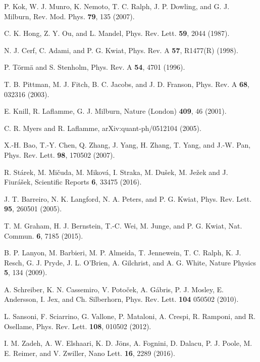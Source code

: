 \documentclass[aps,pra,twocolumn,superscriptaddress,floatfix,10pt]{revtex4}
\begin{document}
\begin{thebibliography}{99}
	
  P. Kok, W. J. Munro,   K.   Nemoto,   T. C.   Ralph,   J. P.
Dowling, and G. J. Milburn, Rev. Mod. Phys. {\bf 79}, 135 (2007).

 C. K. Hong, Z. Y. Ou, and L. Mandel, Phys. Rev. Lett. {\bf 59}, 2044 (1987).

 N. J. Cerf, C. Adami, and P. G. Kwiat, Phys. Rev. A {\bf 57}, R1477(R) (1998).

 P. T\"orm\"a and S. Stenholm, Phys. Rev. A {\bf 54}, 4701 (1996).

 T. B. Pittman, M. J. Fitch, B. C. Jacobs, and J. D. Franson,
Phys. Rev. A {\bf 68}, 032316 (2003).

  E. Knill, R. Laflamme, G. J. Milburn, Nature (London) {\bf 409}, 46 (2001).

 C. R. Myers and R. Laflamme, arXiv:quant-ph/0512104 (2005).

 X.-H. Bao, T.-Y. Chen, Q. Zhang, J. Yang, H. Zhang, T. Yang, and J.-W. Pan,
Phys. Rev. Lett. {\bf 98}, 170502 (2007).

 R. St\'{a}rek, M. Mi\v{c}uda, M. Mikov\'{a}, I. Straka, M. Du\v{s}ek, M. Je\v{z}ek and J. Fiur\'{a}\v{s}ek, Scientific Reports { \bf 6},  33475 (2016).

 J. T. Barreiro, N. K. Langford, N. A. Peters, and P. G. Kwiat,
Phys. Rev. Lett. {\bf 95}, 260501 (2005).

 T. M. Graham, H. J. Bernstein, T.-C. Wei, M. Junge, and P. G. Kwiat, Nat. Commun. {\bf 6}, 7185 (2015).

 B. P. Lanyon, M. Barbieri, M. P. Almeida, T. Jennewein, T. C. Ralph, K. J. Resch, G. J. Pryde, J. L. O'Brien, A. Gilchrist, and A. G. White, Nature Physics {\bf 5}, 134 (2009).

 A. Schreiber, K. N. Cassemiro, V. Poto\v{c}ek, A. G\'{a}bris, P. J. Mosley, E. Andersson, I. Jex, and Ch. Silberhorn, Phys. Rev. Lett. {\bf 104 } 050502 (2010).

 L. Sansoni, F. Sciarrino, G. Vallone, P. Mataloni, A. Crespi, R. Ramponi, and R. Osellame, Phys. Rev. Lett. {\bf 108}, 010502 (2012).

 I. M. Zadeh, A. W. Elshaari, K. D. J\"ons, A. Fognini, D. Dalacu, P. J. Poole, M. E. Reimer, and V. Zwiller, Nano Lett. {\bf 16}, 2289  (2016).


\end{thebibliography}
\end{document}
